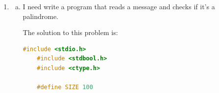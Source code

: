 \documentclass[12pt]{article}
\begin{document}
\begin{enumerate}[1.]
\begin{enumerate}[a)]
\begin{lstlisting}[language=c]
        return 0;
    }
\end{lstlisting}

        \item

\begin{lstlisting}[language=c]
    #include <stdio.h>

    #define SIZE 10

    int main(void) {

        char array[SIZE], c, temp, *p;
        int i = 0, n;

        p = &array[0];

        printf("Enter a message: ");

        // fill array
        do {
            c = getchar();

            if (c == '\n') {
                break;
            }

            *p++ = c;
            i++;
        } while (p < array + SIZE);

        n = i;

        // reverse characters in array
        char *q = &array[0], *r = &array[n-1];

        while (q < r) {
            temp = *q;
            *q++ = *r;
            *r-- = temp;
        }

        printf("Reversal is: ");

        for (p = &array[0]; p < array + n; p++) {
            printf("%c", *p);
        }

        return 0;
    }
\end{lstlisting}

    \end{enumerate}

    \item

    \begin{enumerate}[a)]
        \item

        I need write a program that reads a message and checks if it's a palindrome.

        \bigskip

        The solution to this problem is:

        \bigskip

\begin{lstlisting}[language=c]
    #include <stdio.h>
    #include <stdbool.h>
    #include <ctype.h>

    #define SIZE 100


\end{lstlisting}
\end{enumerate}
\end{enumerate}
\end{document}
